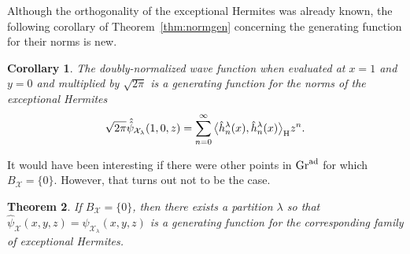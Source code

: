 \documentclass[10pt,a4paper]{amsart}
\numberwithin{equation}{section}
\newtheorem{Theorem}{Theorem}[section]
\newtheorem{Corollary}[Theorem]{Corollary}
\theoremstyle{definition}
\def\X{\mathcal{X}}
\begin{document}
Although the orthogonality of the exceptional Hermites was already known, the following
corollary of Theorem~\ref{thm:normgen} concerning the generating
function for their norms is new.
\begin{Corollary}
The doubly-normalized wave function when evaluated at $x=1$ and
$y=0$ and multiplied by $\sqrt{2\pi}$ is a generating function
for the norms of the exceptional Hermites
\[
\sqrt{2\pi}\hat{\hat\psi}_{\X_{\lambda}}(1,0,z)=\sum_{n=0}^{\infty}\big\langle \hat
h_n^{\lambda}(x),\hat h_n^{\lambda}(x)\big\rangle_{\rm H} z^n.
\]
\end{Corollary}

It would have been interesting if there were other points in ${\rm Gr}^{\rm ad}$
for which $B_{\X}=\{0\}$. However, that turns out not to be the case.


\begin{Theorem}\label{thm:onlyxh}
If $B_{\X}=\{0\}$, then there exists a partition $\lambda$ so that
$\hat\psi_{\X}(x,y,z)=\hat\psi_{\X_{\lambda}}(x,y,z)$ is a generating function
for the corresponding family of exceptional Hermites.
\end{Theorem}
\end{document}
